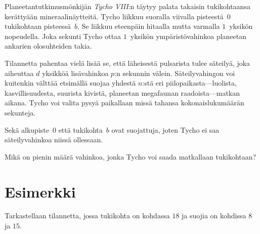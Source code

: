 

\noindent
Planeetantutkimusmönkijän \emph{Tycho VIII}:n täytyy palata takaisin tukikohtaansa 
kerättyään mineraalinäytteitä.
Tycho liikkuu suoralla viivalla pisteestä~$0$ tukikohtaan pisteessä~$b$.
Se liikkuu eteenpäin hitaalla mutta varmalla $1$~yksikön nopeudella.
Joka sekunti Tycho ottaa $1$~yksikön ympäristövahinkoa planeetan ankarien 
olosuhteiden takia.

Tilannetta pahentaa vielä lisää se, että läheisestä pulsarista tulee säteilyä, joka 
aiheuttaa $d$ yksikköä lisävahinkoa $p$:n sekunnin välein.
Säteilyvahingon voi kuitenkin välttää etsimällä suojaa yhdestä $n$:stä eri 
piilopaikasta---luolista, kasvillisuudesta, suurista kivistä, planeetan megafaunan 
raadoista---matkan aikana.
Tycho voi valita pysyä paikallaan missä tahansa kokonaislukumäärän sekunteja.

Sekä alkupiste~$0$ että tukikohta~$b$ ovat suojattuja, joten Tycho ei saa 
säteilyvahinkoa niissä ollessaan.

\medskip
Mikä on pienin määrä vahinkoa, jonka Tycho voi saada matkallaan tukikohtaan?

\section*{Esimerkki}

Tarkastellaan tilannetta, jossa tukikohta on kohdassa $18$ ja suojia on kohdissa $8$ ja $15$.

